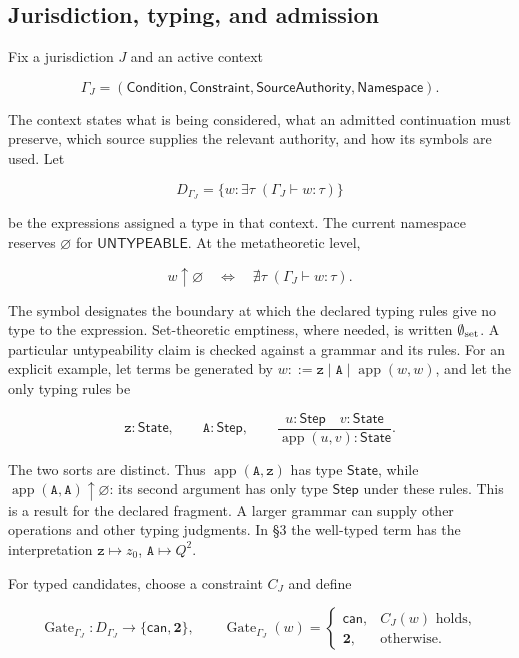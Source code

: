 \hypertarget{jurisdiction-typing-and-admission}{%
\subsection{Jurisdiction, typing, and admission}\label{jurisdiction-typing-and-admission}}

Fix a jurisdiction \(J\) and an active context

\[
\Gamma_J=(\mathsf{Condition},\mathsf{Constraint},
\mathsf{SourceAuthority},\mathsf{Namespace}).
\tag{2}
\]

The context states what is being considered, what an admitted continuation must preserve, which source supplies the relevant authority, and how its symbols are used. Let

\[
D_{\Gamma_J}=
\{w:\exists\tau\;(\Gamma_J\vdash w:\tau)\}
\tag{3}
\]

be the expressions assigned a type in that context. The current namespace reserves \(\varnothing\) for \(\mathsf{UNTYPEABLE}\). At the metatheoretic level,

\[
w\uparrow\varnothing
\quad\Longleftrightarrow\quad
\nexists\tau\;(\Gamma_J\vdash w:\tau).
\tag{4}
\]

The symbol designates the boundary at which the declared typing rules give no type to the expression. Set-theoretic emptiness, where needed, is written \(\emptyset_{\rm set}\). A particular untypeability claim is checked against a grammar and its rules. For an explicit example, let terms be generated by \(w::=\mathtt z\mid\mathtt A\mid\operatorname{app}(w,w)\), and let the only typing rules be

\[
\mathtt z:\mathsf{State},\qquad
\mathtt A:\mathsf{Step},\qquad
\frac{u:\mathsf{Step}\quad v:\mathsf{State}}
{\operatorname{app}(u,v):\mathsf{State}}.
\tag{4a}
\]

The two sorts are distinct. Thus \(\operatorname{app}(\mathtt A,\mathtt z)\) has type \(\mathsf{State}\), while \(\operatorname{app}(\mathtt A,\mathtt A)\uparrow\varnothing\): its second argument has only type \(\mathsf{Step}\) under these rules. This is a result for the declared fragment. A larger grammar can supply other operations and other typing judgments. In §3 the well-typed term has the interpretation \(\mathtt z\mapsto z_0\), \(\mathtt A\mapsto Q^2\).

For typed candidates, choose a constraint \(C_J\) and define

\[
\operatorname{Gate}_{\Gamma_J}:D_{\Gamma_J}
\longrightarrow\{\mathsf{can},\mathbf 2\},\qquad
\operatorname{Gate}_{\Gamma_J}(w)=
\begin{cases}
\mathsf{can},&C_J(w)\text{ holds},\\
\mathbf 2,&\text{otherwise}.
\end{cases}
\tag{5}
\]

